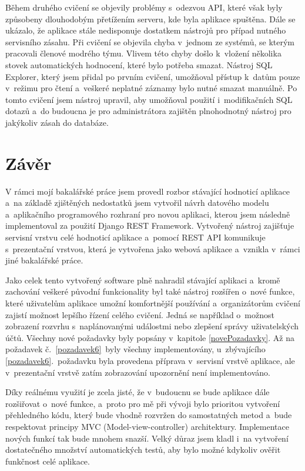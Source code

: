 \documentclass[
  digital,
  twoside,
  table, 
  nolof, 
  nolot
]{fithesis3}
\begin{document}
Během druhého cvičení se objevily problémy s~odezvou API, které však byly způsobeny dlouhodobým přetížením serveru, kde byla aplikace spuštěna. Dále se ukázalo, že aplikace stále nedisponuje dostatkem nástrojů pro případ nutného servisního zásahu. Při cvičení se objevila chyba v~jednom ze systémů, se kterým pracovali členové modrého týmu. Vlivem této chyby došlo k~vložení několika stovek automatických hodnocení, které bylo potřeba smazat. Nástroj SQL Explorer, který jsem přidal po prvním cvičení, umožňoval přístup k~datům pouze v~režimu pro čtení a~veškeré neplatné záznamy bylo nutné smazat manuálně. Po tomto cvičení jsem nástroj upravil, aby umožňoval použití i~modifikačních SQL dotazů a~do budoucna je pro administrátora zajištěn plnohodnotný nástroj pro jakýkoliv zásah do databáze.

\chapter{Závěr}
\label{end}

V rámci mojí bakalářské práce jsem provedl rozbor stávající hodnoticí aplikace a~na základě zjištěných nedostatků jsem vytvořil návrh datového modelu a~aplikačního programového rozhraní pro novou aplikaci, kterou jsem následně implementoval za použití Django REST Framework. Vytvořený nástroj zajišťuje servisní vrstvu celé hodnoticí aplikace a~pomocí REST API komunikuje s~prezentační vrstvou, která je vytvořena jako webová aplikace a~vznikla v~rámci jiné bakalářské práce. 

Jako celek tento vytvořený software plně nahradil stávající aplikaci a~kromě zachování veškeré původní funkcionality byl také nástroj rozšířen o~nové funkce, které uživatelům aplikace umožní komfortnější používání a~organizátorům cvičení zajistí možnost lepšího řízení celého cvičení. Jedná se například o~možnost zobrazení rozvrhu s~naplánovanými událostmi nebo zlepšení správy uživatelských účtů. Všechny nové požadavky byly popsány v~kapitole \ref{novePozadavky}. Až na požadavek č.~\ref{pozadavek6}~byly všechny implementovány, u~zbývajícího \ref{pozadavek6}.~požadavku byla provedena příprava v~servisní vrstvě aplikace, ale v~prezentační vrstvě zatím zobrazování upozornění není implementováno.

Díky reálnému využití je zcela jisté, že v~budoucnu se bude aplikace dále rozšiřovat o~nové funkce, a~proto pro mě při vývoji bylo prioritou vytvoření přehledného kódu, který bude vhodně rozvržen do samostatných metod a~bude respektovat principy MVC (Model-view-controller) architektury. Implementace nových funkcí tak bude mnohem snazší. Velký důraz jsem kladl i~na vytvoření dostatečného množství automatických testů, aby bylo možné kdykoliv ověřit funkčnost celé aplikace.
\end{document}
